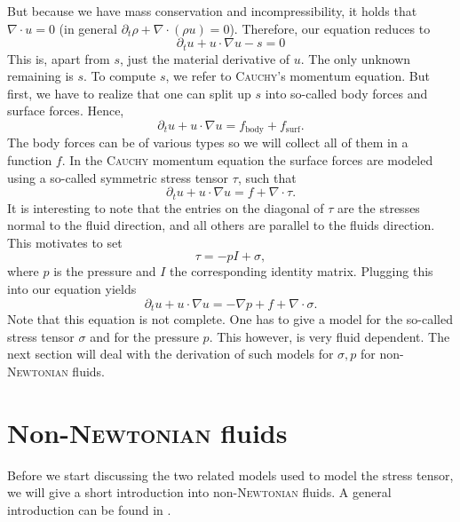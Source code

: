 \documentclass[12pt,a4paper,twoside, open=right]{scrreprt}
\theoremstyle{definition}
\theoremstyle{plain}
\begin{document}
But because we have mass conservation and incompressibility, it holds that $\nabla\cdot u =0$ (in general $\partial_t \rho + \nabla\cdot(\rho u) =0$). Therefore, our equation reduces to 
\begin{equation}
    \partial_t u+ u\cdot \nabla u -s =0
\end{equation}
This is, apart from $s$, just the material derivative of $u$.
The only unknown remaining is $s$. To compute $s$, we refer to \textsc{Cauchy}'s momentum equation. But first, we have to realize that one can split up $s$ into so-called body forces and surface forces. Hence, 
\begin{equation}
   \partial_t u + u\cdot \nabla u = f_{\mathrm{body}} +f_{\mathrm{surf}} .
\end{equation}
The body forces can be of various types so we will collect all of them in a function $f$. In the \textsc{Cauchy} momentum equation the surface forces are modeled using a  so-called symmetric stress tensor $\tau$, such that
\begin{equation}
    \partial_t u + u\cdot \nabla u = f + \nabla\cdot\tau.
\end{equation}
It is interesting to note that the entries on the diagonal of $\tau$ are the stresses normal to the fluid direction, and all others are parallel to the fluids direction. This motivates to set
\begin{equation}
    \tau = -pI+\sigma,
\end{equation}
where $p$ is the pressure and $I$ the corresponding identity matrix. Plugging this into our equation yields
\begin{equation}
    \partial_t u + u\cdot \nabla u = -\nabla p + f + \nabla\cdot\sigma.
\end{equation}
Note that this equation is not complete. One has to give a model for the so-called stress tensor $\sigma$ and for the pressure $p$. This however, is very fluid dependent. The next section will deal with the derivation of such models for $\sigma,p$ for non-\textsc{Newtonian} fluids.
\section{Non-\textsc{Newtonian} fluids}
\label{sec:physics}

Before we start discussing the two related models used to model the stress tensor, we will give a short introduction into non-\textsc{Newtonian} fluids. A general introduction can be found in \cite{Ouellette2013}.
\end{document}
